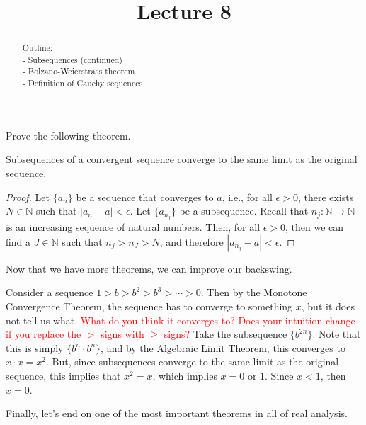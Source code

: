 \documentclass{ximera}
\begin{document}
    \title{Lecture 8}
    
    \begin{abstract}  
    Outline: \\
    - Subsequences (continued) \\
    - Bolzano-Weierstrass theorem \\
    - Definition of Cauchy sequences
\end{abstract}

\maketitle

\begin{exercise}
Prove the following theorem.
\begin{theorem}
    Subsequences of a convergent sequence converge to the same limit as the original sequence.
\end{theorem}
\end{exercise}
\begin{proof}
    Let $\{a_n\}$ be a sequence that converges to $a$, i.e., for all $\epsilon > 0$, there exists $N \in \mathbb{N}$ such that $|a_n-a| < \epsilon$.  Let $\{a_{n_j}\}$ be a subsequence.  Recall that $n_j:\mathbb{N}\to \mathbb{N}$ is an increasing sequence of natural numbers.  Then, for all $\epsilon > 0$, then we can find a $J \in\mathbb{N}$ such that $n_j > n_J > N$, and therefore $|a_{n_j} -a| < \epsilon$.
\end{proof}

Now that we have more theorems, we can improve our backswing.  
\begin{example}
    Consider a sequence $1> b > b^2 > b^3 > \cdots > 0$.  Then by the Monotone Convergence Theorem, the sequence has to converge to something $x$, but it does not tell us what. \textcolor{red}{What do you think it converges to? Does your intuition change if you replace the $>$ signs with $\geq$ signs?} Take the subsequence $\{b^{2n}\}$.  Note that this is simply $\{b^n\cdot b^n\}$, and by the Algebraic Limit Theorem, this converges to $x\cdot x = x^2$.  But, since subsequences converge to the same limit as the original sequence, this implies that $x^2 =x$, which implies $x = 0$ or $1$.  Since $x <1$, then $x=0$.
\end{example}

Finally, let's end on one of the most important theorems in all of real analysis.
\end{document}
